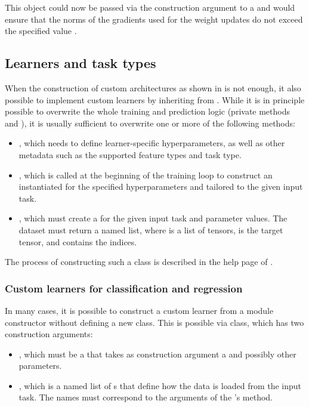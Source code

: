 \documentclass[article]{jss}
\theoremstyle{definition}
\begin{document}
This object could now be passed via the  construction argument to a  and would ensure that the norms of the gradients used for the weight updates do not exceed the specified value .


\subsection{Learners and task types}\label{sec:extending-learner-task}

When the construction of custom architectures as shown in  is not enough, it also possible to implement custom learners by inheriting from .
While it is in principle possible to overwrite the whole training and prediction logic (private methods  and ), it is usually sufficient to overwrite one or more of the following methods:
\begin{itemize}
    \item {}, which needs to define learner-specific hyperparameters, as well as other metadata such as the supported feature types and task type.
    \item {}, which is called at the beginning of the training loop to construct an instantiated  for the specified hyperparameters and tailored to the given input task.
    \item {}, which must create a  for the given input task and parameter values. The dataset must return a named list, where  is a list of tensors,  is the target tensor, and  contains the indices.
\end{itemize}

The process of constructing such a class is described in the help page of .

\subsubsection{Custom learners for classification and regression}\label{sec:extending-learner}

In many cases, it is possible to construct a custom learner from a module constructor without defining a new class.
This is possible via  class, which has two construction arguments:
\begin{itemize}
    \item {}, which must be a  that takes as construction argument a  and possibly other parameters.
    \item {}, which is a named list of s that define how the data is loaded from the input task. The names must correspond to the arguments of the 's  method.
\end{itemize}
\end{document}
